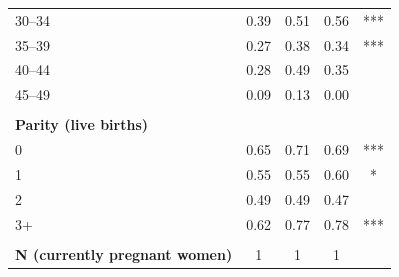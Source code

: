 \begin{tabular}{lcccc}
\hspace*{2em}30--34&0.39&0.51&0.56&***\\
\hspace*{2em}35--39&0.27&0.38&0.34&***\\
\hspace*{2em}40--44&0.28&0.49&0.35&\\
\hspace*{2em}45--49&0.09&0.13&0.00&\\
&&&&\\
\textbf{Parity (live births)}&&&&\\
\hspace*{2em}0&0.65&0.71&0.69&***\\
\hspace*{2em}1&0.55&0.55&0.60&*\\
\hspace*{2em}2&0.49&0.49&0.47&\\
\hspace*{2em}3+&0.62&0.77&0.78&***\\
&&&&\\
\textbf{N (currently pregnant women)}&1&1&1&\\
\bottomrule
\end{tabular}
